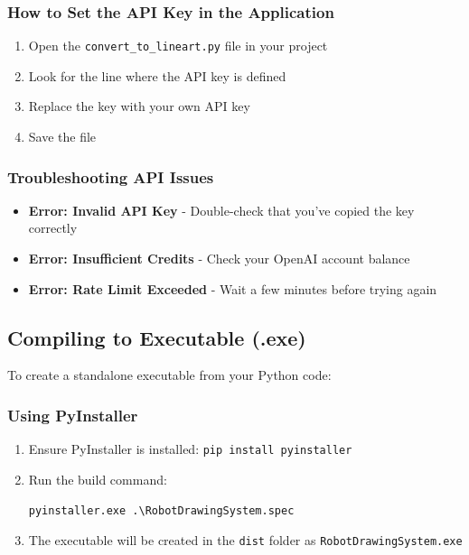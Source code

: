 \documentclass[a4paper,12pt]{article}
\begin{document}
\subsubsection{How to Set the API Key in the Application}
\begin{enumerate}
\item Open the \texttt{convert\_to\_lineart.py} file in your project
\item Look for the line where the API key is defined
\item Replace the key with your own API key
\item Save the file
\end{enumerate}


\subsubsection{Troubleshooting API Issues}
\begin{itemize}
\item \textbf{Error: Invalid API Key} - Double-check that you've copied the key correctly
\item \textbf{Error: Insufficient Credits} - Check your OpenAI account balance
\item \textbf{Error: Rate Limit Exceeded} - Wait a few minutes before trying again
\end{itemize}


\subsection{Compiling to Executable (.exe)}

To create a standalone executable from your Python code:

\subsubsection{Using PyInstaller}
\begin{enumerate}
\item Ensure PyInstaller is installed: \texttt{pip install pyinstaller}
\item Run the build command:
\begin{verbatim}
pyinstaller.exe .\RobotDrawingSystem.spec
\end{verbatim}
\item The executable will be created in the \texttt{dist} folder as \texttt{RobotDrawingSystem.exe}
\end{enumerate}
\end{document}
